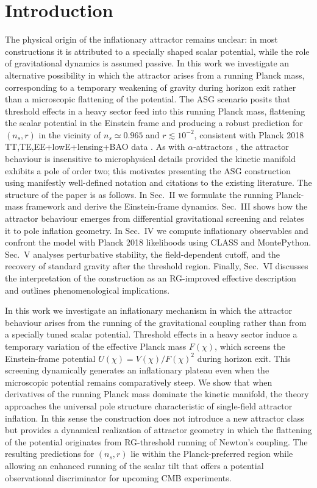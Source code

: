 \documentclass[
]{article}
\begin{document}
\section{Introduction}\label{introduction}

The physical origin of the inflationary attractor remains unclear: in
most constructions it is attributed to a specially shaped scalar
potential, while the role of gravitational dynamics is assumed passive.
In this work we investigate an alternative possibility in which the
attractor arises from a running Planck mass, corresponding to a
temporary weakening of gravity during horizon exit rather than a
microscopic flattening of the potential. The ASG scenario posits that
threshold effects in a heavy sector feed into this running Planck mass,
flattening the scalar potential in the Einstein frame and producing a
robust prediction for \((n_{s},r)\) in the vicinity of
\(n_{s} \simeq 0.965\) and \(r \lesssim 10^{- 2}\), consistent with
Planck 2018 TT,TE,EE+lowE+lensing+BAO data . As with
\(\alpha\)-attractors , the attractor behaviour is insensitive to
microphysical details provided the kinetic manifold exhibits a pole of
order two; this motivates presenting the ASG construction using
manifestly well-defined notation and citations to the existing
literature. The structure of the paper is as follows. In Sec.~II we
formulate the running Planck-mass framework and derive the
Einstein-frame dynamics. Sec.~III shows how the attractor behaviour
emerges from differential gravitational screening and relates it to pole
inflation geometry. In Sec.~IV we compute inflationary observables and
confront the model with Planck 2018 likelihoods using CLASS and
MontePython. Sec.~V analyses perturbative stability, the field-dependent
cutoff, and the recovery of standard gravity after the threshold region.
Finally, Sec.~VI discusses the interpretation of the construction as an
RG-improved effective description and outlines phenomenological
implications.

In this work we investigate an inflationary mechanism in which the
attractor behaviour arises from the running of the gravitational
coupling rather than from a specially tuned scalar potential. Threshold
effects in a heavy sector induce a temporary variation of the effective
Planck mass \(F(\chi)\), which screens the Einstein-frame potential
\(U(\chi) = V(\chi)/F(\chi)^{2}\) during horizon exit. This screening
dynamically generates an inflationary plateau even when the microscopic
potential remains comparatively steep. We show that when derivatives of
the running Planck mass dominate the kinetic manifold, the theory
approaches the universal pole structure characteristic of single-field
attractor inflation. In this sense the construction does not introduce a
new attractor class but provides a dynamical realization of attractor
geometry in which the flattening of the potential originates from
RG-threshold running of Newton's coupling. The resulting predictions for
\((n_{s},r)\) lie within the Planck-preferred region while allowing an
enhanced running of the scalar tilt that offers a potential
observational discriminator for upcoming CMB experiments.
\end{document}
